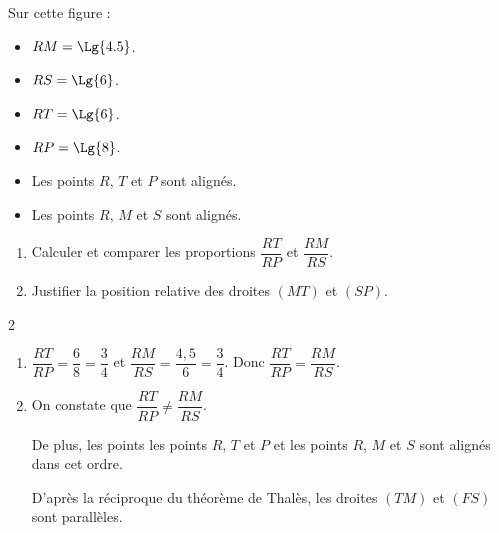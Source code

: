 \begin{exercice*}
    Sur cette figure :
    
    \begin{minipage}{0.35\linewidth}        
        \hspace*{-15mm}  
    \end{minipage}
    \begin{minipage}{0.65\linewidth}        
        \begin{itemize}
            \item $RM=\Lg{4.5}$.
            \item $RS=\Lg{6}$.
            \item $RT=\Lg{6}$.
            \item $RP=\Lg{8}$.
            \item Les points $R$, $T$ et $P$ sont alignés.
            \item Les points $R$, $M$ et $S$ sont alignés.            
        \end{itemize}
    \end{minipage}
    \begin{enumerate}
        \item Calculer et comparer les proportions $\dfrac{RT}{RP}$ et $\dfrac{RM}{RS}$.
        
        \medskip
        \item Justifier la position relative des droites $(MT)$ et $(SP)$.
    \end{enumerate}
\end{exercice*}
\begin{corrige}
    \phantom{rrr}
    \begin{spacing}2
    \begin{enumerate}
        \item $\dfrac{RT}{RP}=\dfrac{6}{8}=\dfrac{3}{4}$ et $\dfrac{RM}{RS}=\dfrac{4,5}{6}=\dfrac{3}{4}$. Donc $\dfrac{RT}{RP}=\dfrac{RM}{RS}$.
        \item On constate que $\dfrac{RT}{RP}\neq\dfrac{RM}{RS}$.
        
        De plus, les points les points $R$, $T$ et $P$ et les points $R$, $M$ et $S$ sont alignés dans cet ordre.            

        D'après la réciproque du théorème de Thalès, les droites $(TM)$ et $(FS)$ sont parallèles.
    \end{enumerate}  
    \end{spacing}
\end{corrige}

